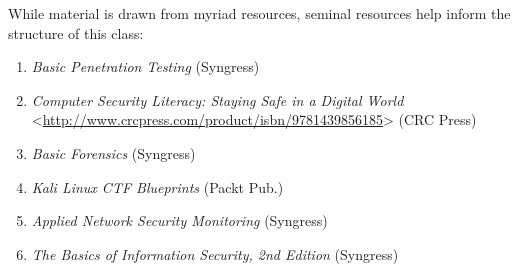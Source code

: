 \documentclass[letterpaper,10pt,english]{sphinxmanual}
\begin{document}
While material is drawn from myriad resources, seminal resources help inform the structure of this class:
\begin{enumerate}
\item {} 
\emph{Basic Penetration Testing}  (Syngress)

\item {} 
\emph{Computer Security Literacy: Staying Safe in a Digital World} \textless{}\href{http://www.crcpress.com/product/isbn/9781439856185}{http://www.crcpress.com/product/isbn/9781439856185}\textgreater{} (CRC Press)

\item {} 
\emph{Basic Forensics} (Syngress)

\item {} 
\emph{Kali Linux CTF Blueprints} (Packt Pub.)

\item {} 
\emph{Applied Network Security Monitoring} (Syngress)

\item {} 
\emph{The Basics of Information Security, 2nd Edition} (Syngress)

\end{enumerate}
\end{document}
